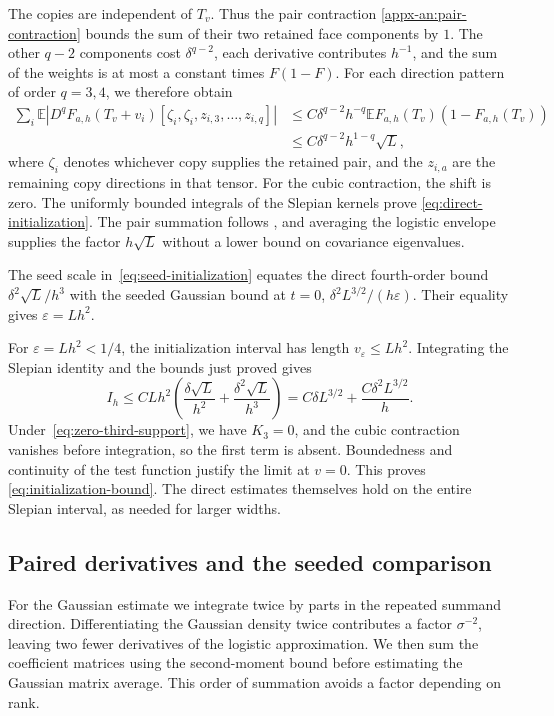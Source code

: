 \documentclass[11pt,letterpaper]{article}
\theoremstyle{remark}
\newcommand{\E}{\mathbb E}
\begin{document}
The copies are independent of \(T_v\). Thus the pair contraction
\eqref{appx-an:pair-contraction} bounds the sum of their two retained
face components by \(1\). The other \(q-2\) components cost
\(\delta^{q-2}\), each derivative contributes \(h^{-1}\), and
the sum of the weights is at most a constant times \(F(1-F)\).
For each direction pattern of order \(q=3,4\), we therefore obtain
\[
 \begin{aligned}
 \sum_i\E\left|D^qF_{a,h}(T_v+v_i)
       [\zeta_i,\zeta_i,z_{i,3},\ldots,z_{i,q}]\right|
 &\le C\delta^{q-2}h^{-q}\E F_{a,h}(T_v)(1-F_{a,h}(T_v))\\
 &\le C\delta^{q-2}h^{1-q}\sqrt L,
 \end{aligned}
\]
where \(\zeta_i\) denotes whichever copy supplies the retained pair,
and the \(z_{i,a}\) are the remaining copy directions in that tensor.
For the cubic contraction, the shift is zero.
The uniformly bounded integrals of the Slepian kernels prove
\eqref{eq:direct-initialization}. The pair summation follows
\cite[Lemma~4.1]{AL}, and averaging the logistic envelope supplies
the factor \(h\sqrt L\) without a lower bound on covariance
eigenvalues.

The seed scale in~\eqref{eq:seed-initialization} equates the direct
fourth-order bound \(\delta^2\sqrt L/h^3\) with the seeded Gaussian
bound at \(t=0\), \(\delta^2L^{3/2}/(h\varepsilon)\).
Their equality gives \(\varepsilon=Lh^2\).


For \(\varepsilon=Lh^2<1/4\), the initialization interval has length
\(v_\varepsilon\le Lh^2\). Integrating the Slepian identity and
the bounds just proved gives
\[
 I_h\le C Lh^2\left(\frac{\delta\sqrt L}{h^2}
                     +\frac{\delta^2\sqrt L}{h^3}\right)
      =C\delta L^{3/2}+\frac{C\delta^2L^{3/2}}h.
\]
Under~\eqref{eq:zero-third-support}, we have \(K_3=0\), and the
cubic contraction vanishes before integration,
so the first term is absent. Boundedness and continuity of the
test function justify the limit at \(v=0\). This proves
\eqref{eq:initialization-bound}. The direct estimates themselves
hold on the entire Slepian interval, as needed for larger widths.

\subsection{Paired derivatives and the seeded comparison}
\label{appx-an:sec:restoration}

For the Gaussian estimate we integrate twice by parts in the repeated
summand direction. Differentiating the Gaussian density twice contributes a factor
\(\sigma^{-2}\), leaving two fewer derivatives of the logistic
approximation. We then sum the coefficient matrices using the
second-moment bound before estimating the Gaussian matrix average.
This order of summation avoids a factor depending on rank.
\end{document}
